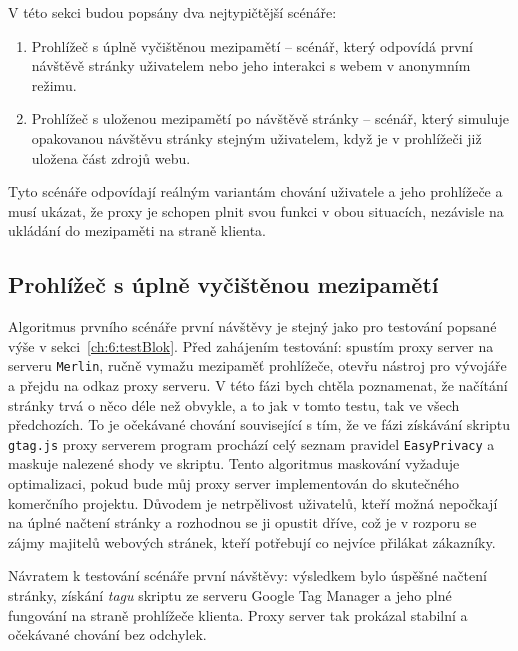 V této sekci budou popsány dva nejtypičtější scénáře: 

\begin{enumerate}
    \item Prohlížeč s úplně vyčištěnou mezipamětí -- scénář, který odpovídá první návštěvě stránky uživatelem nebo jeho interakci s webem v anonymním režimu.
    \item Prohlížeč s uloženou mezipamětí po návštěvě stránky -- scénář, který simuluje opakovanou návštěvu stránky stejným uživatelem, když je v prohlížeči již uložena část zdrojů webu. 
\end{enumerate}

Tyto scénáře odpovídají reálným variantám chování uživatele a jeho prohlížeče a musí ukázat, že proxy je schopen plnit svou funkci v obou situacích, nezávisle na ukládání do mezipaměti na straně klienta.

\subsection*{Prohlížeč s úplně vyčištěnou mezipamětí}
Algoritmus prvního scénáře první návštěvy je stejný jako pro testování popsané výše v sekci~\ref{ch:6:testBlok}. Před zahájením testování: spustím proxy server na serveru \texttt{Merlin}, ručně vymažu mezipaměť prohlížeče, otevřu nástroj pro vývojáře a přejdu na odkaz proxy serveru. V této fázi bych chtěla poznamenat, že načítání stránky trvá o něco déle než obvykle, a to jak v tomto testu, tak ve všech předchozích. To je očekávané chování související s tím, že ve fázi získávání skriptu \texttt{gtag.js} proxy serverem program prochází celý seznam pravidel \texttt{EasyPrivacy} a maskuje nalezené shody ve skriptu. Tento algoritmus maskování vyžaduje optimalizaci, pokud bude můj proxy server implementován do skutečného komerčního projektu. Důvodem je netrpělivost uživatelů, kteří možná nepočkají na úplné načtení stránky a rozhodnou se ji opustit dříve, což je v rozporu se zájmy majitelů webových stránek, kteří potřebují co nejvíce přilákat zákazníky. 

Návratem k testování scénáře první návštěvy: výsledkem bylo  úspěšné načtení stránky, získání {\it tagu} skriptu ze serveru Google Tag Manager a jeho plné fungování na straně prohlížeče klienta. Proxy server tak prokázal stabilní a očekávané chování bez odchylek. 

